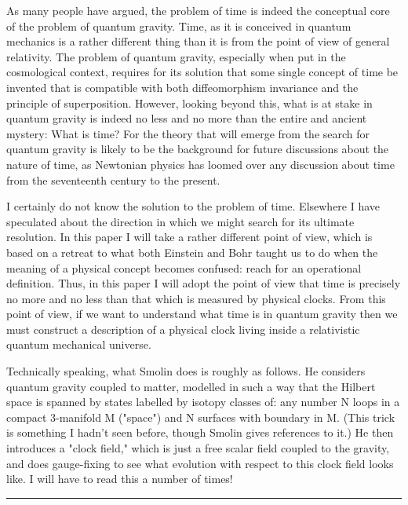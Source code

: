 As many people have argued, the problem of time is indeed the conceptual
core of the problem of quantum gravity.  Time, as it is conceived in
quantum mechanics is a rather different thing than it is from the
point of view of general relativity.  The problem of quantum gravity,
especially when put in the cosmological context, requires for
its solution that some single concept of time be invented that is
compatible with both diffeomorphism invariance and the principle
of superposition.  However, looking beyond this, what is at stake in
quantum gravity is indeed no less and no more than
the entire and ancient mystery: What is time?  For the theory that will 
emerge from the search for quantum gravity is likely to be the background 
for future discussions about the nature of time, as Newtonian physics
has loomed over any discussion about time from the seventeenth century
to the present.

I certainly do not know the solution to the problem of time.  Elsewhere I have
speculated about the direction in which we might search for its
ultimate resolution.  In this paper I will take a rather different
point of view, which is based on a retreat to what both Einstein and
Bohr taught us to do when the meaning of a physical concept becomes
confused: reach for an operational definition.  Thus, in
this paper I will adopt the point of view that time is precisely
no more and no less than that which is measured by physical clocks.  From
this point of view, if we want to understand what
time is in quantum gravity then we must construct a description of
a physical clock living inside a relativistic quantum mechanical
universe.

Technically speaking, what Smolin does is roughly as follows.  He
considers quantum gravity coupled to matter, modelled in such a way 
that the Hilbert space is spanned by states labelled by isotopy
classes of: any number N loops in a compact 3-manifold M ("space") and N 
surfaces with boundary in M.  (This trick is something I hadn't seen
before, though Smolin gives references to it.)   He then introduces
a "clock field," which is just a free scalar field coupled to the gravity,
and does gauge-fixing to see what evolution with respect to this
clock field looks like.   I will have to read this a number of times!
\par\noindent\rule{\textwidth}{0.4pt}


